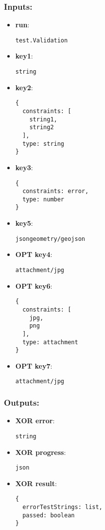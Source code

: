 \subsubsection*{Inputs:}
\begin{itemize}
  \small
    \item \textbf{run}: 
\begin{lstlisting}
test.Validation
\end{lstlisting}
    \item \textbf{key1}: 
\begin{lstlisting}
string
\end{lstlisting}
    \item \textbf{key2}: 
\begin{lstlisting}
{
  constraints: [
    string1, 
    string2
  ], 
  type: string
}
\end{lstlisting}
    \item \textbf{key3}: 
\begin{lstlisting}
{
  constraints: error, 
  type: number
}
\end{lstlisting}
    \item \textbf{key5}: 
\begin{lstlisting}
jsongeometry/geojson
\end{lstlisting}
    \item \textbf{OPT key4}: 
\begin{lstlisting}
attachment/jpg
\end{lstlisting}
    \item \textbf{OPT key6}: 
\begin{lstlisting}
{
  constraints: [
    jpg, 
    png
  ], 
  type: attachment
}
\end{lstlisting}
    \item \textbf{OPT key7}: 
\begin{lstlisting}
attachment/jpg
\end{lstlisting}
  \end{itemize}
\subsubsection*{Outputs:}
\begin{itemize}
  \small
    \item \textbf{XOR error}: 
\begin{lstlisting}
string
\end{lstlisting}
    \item \textbf{XOR progress}: 
\begin{lstlisting}
json
\end{lstlisting}
    \item \textbf{XOR result}: 
\begin{lstlisting}
{
  errorTestStrings: list, 
  passed: boolean
}
\end{lstlisting}
  \end{itemize}

